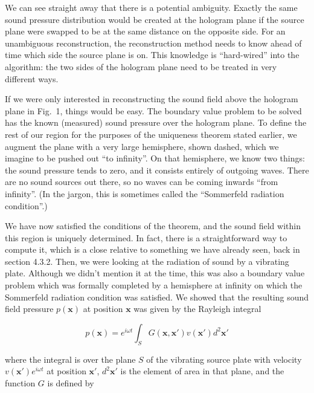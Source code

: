 
  We can see straight away that there is a potential ambiguity. Exactly the 
  same sound pressure distribution would be created at the hologram plane if 
  the source plane were swapped to be at the same distance on the opposite 
  side. For an unambiguous reconstruction, the reconstruction method needs to 
  know ahead of time which side the source plane is on. This knowledge is 
  ``hard-wired'' into the algorithm: the two sides of the hologram plane need 
  to be treated in very different ways. 

  If we were only interested in reconstructing the sound field above the 
  hologram plane in Fig.\ 1, things would be easy. The boundary value problem 
  to be solved has the known (measured) sound pressure over the hologram plane. 
  To define the rest of our region for the purposes of the uniqueness theorem 
  stated earlier, we augment the plane with a very large hemisphere, shown 
  dashed, which we imagine to be pushed out ``to infinity''. On that 
  hemisphere, we know two things: the sound pressure tends to zero, and it 
  consists entirely of outgoing waves. There are no sound sources out there, so 
  no waves can be coming inwards ``from infinity''. (In the jargon, this is 
  sometimes called the ``Sommerfeld radiation condition''.) 

  We have now satisfied the conditions of the theorem, and the sound field 
  within this region is uniquely determined. In fact, there is a 
  straightforward way to compute it, which is a close relative to something we 
  have already seen, back in section 4.3.2. Then, we were looking at the 
  radiation of sound by a vibrating plate. Although we didn't mention it at the 
  time, this was also a boundary value problem which was formally completed by 
  a hemisphere at infinity on which the Sommerfeld radiation condition was 
  satisfied. We showed that the resulting sound field pressure $p(\mathbf{x})$ 
  at position $\mathbf{x}$ was given by the Rayleigh integral 

  \begin{equation*}p(\mathbf{x}) = e^{i \omega t} 
  \int_S{G(\mathbf{x},\mathbf{x'}) v(\mathbf{x'}) d^2 \mathbf{x'}} 
  \tag{1}\end{equation*} 

  \noindent{}where the integral is over the plane $S$ of the vibrating source 
  plate with velocity $v(\mathbf{x'})e^{i \omega t}$ at position $\mathbf{x'}$, 
  $d^2 \mathbf{x'}$ is the element of area in that plane, and the function $G$ 
  is defined by 


